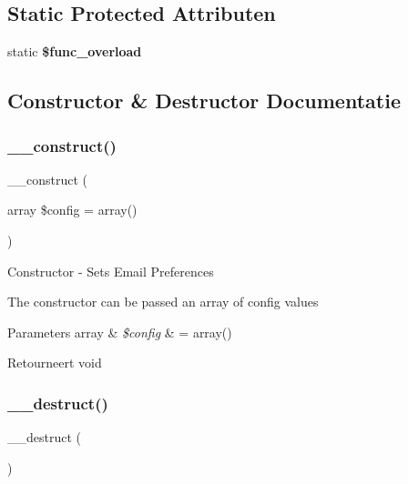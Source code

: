 \subsection*{Static Protected Attributen}
\begin{DoxyCompactItemize}
\item 
\mbox{\label{class_c_i___email_aef84be58d58a5895572c5689e56a1047}} 
static {\bfseries \$func\+\_\+overload}
\end{DoxyCompactItemize}


\subsection{Constructor \& Destructor Documentatie}
\mbox{\label{class_c_i___email_a35018c0dc92a448db5c4686364ced754}} 
\subsubsection{\texorpdfstring{\_\_construct()}{\_\_construct()}}
{\footnotesize\ttfamily \+\_\+\+\_\+construct (\begin{DoxyParamCaption}\item[{array}]{\$config = {\ttfamily array()} }\end{DoxyParamCaption})}

Constructor -\/ Sets Email Preferences

The constructor can be passed an array of config values


\begin{DoxyParams}[1]{Parameters}
array & {\em \$config} & = array() \\
\hline
\end{DoxyParams}
\begin{DoxyReturn}{Retourneert}
void 
\end{DoxyReturn}
\mbox{\label{class_c_i___email_a421831a265621325e1fdd19aace0c758}} 
\subsubsection{\texorpdfstring{\_\_destruct()}{\_\_destruct()}}
{\footnotesize\ttfamily \+\_\+\+\_\+destruct (\begin{DoxyParamCaption}{ }\end{DoxyParamCaption})}

